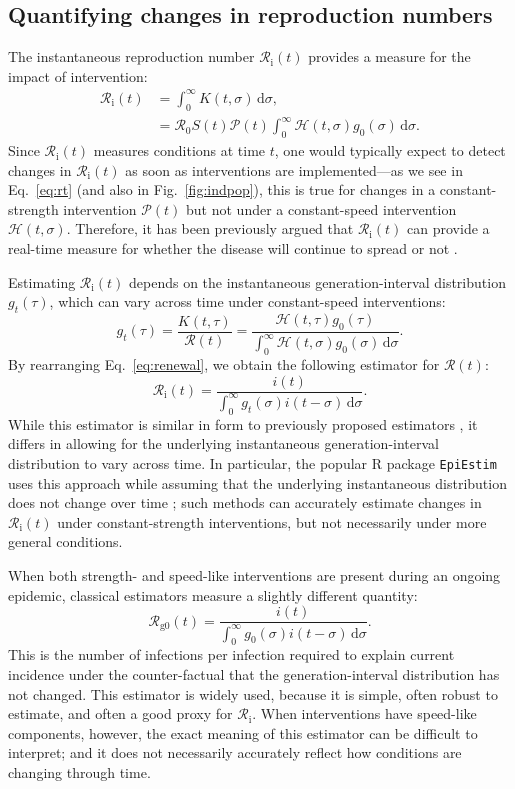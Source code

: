 \documentclass[12pt]{article}
\newcommand{\eref}[1]{Eq.~\ref{eq:#1}}
\newcommand{\fref}[1]{Fig.~\ref{fig:#1}}
\newcommand{\Rx}[1]{\ensuremath{{\mathcal R}_{#1}}\xspace}
\newcommand{\Ri}{\Rx{\mathrm{i}}}
\newcommand{\RR}{\ensuremath{{\mathcal R}}\xspace}
\newcommand{\Rcori}{\Rx{\mathrm{g0}}}
\newcommand{\dd}[1]{\ensuremath{\, \mathrm{d}#1}}
\newcommand{\dsigma}{\dd{\sigma}}
\newcommand{\PP}{\ensuremath{\mathcal P}}
\newcommand{\HH}{\ensuremath{\mathcal H}}
\begin{document}
\subsection{Quantifying changes in reproduction numbers}

The instantaneous reproduction number $\Ri(t)$ provides a measure for the impact of intervention:
\begin{align}
\Ri(t) &= \int_0^\infty K(t, \sigma) \dsigma, \\
&= \RR_0 S(t) \PP(t) \int_0^\infty \HH(t,\sigma) g_0(\sigma) \dsigma.
\label{eq:rt}
\end{align}
Since $\Ri(t)$ measures conditions at time $t$, one would typically expect to detect changes in $\Ri(t)$ as soon as interventions are implemented---as we see in \eref{rt} (and also in \fref{indpop}), this is true for changes in a constant-strength intervention $\PP(t)$ but not under a constant-speed intervention $\HH(t, \sigma)$.
Therefore, it has been previously argued that $\Ri(t)$ can provide a real-time measure for whether the disease will continue to spread or not \citep{gostic2020practical}.

Estimating $\Ri(t)$ depends on the instantaneous generation-interval distribution $g_t(\tau)$,
which can vary across time under constant-speed interventions:
\begin{equation}
g_t(\tau) = \frac{K(t, \tau)}{\RR(t)} = \frac{\HH(t,\tau) g_0(\tau)}{\int_0^\infty \HH(t,\sigma) g_0(\sigma) \dsigma}.
\end{equation}
By rearranging \eref{renewal}, we obtain the following estimator for $\RR(t)$:
\begin{equation}
\Ri(t) = \frac{i(t)}{\int_0^\infty g_t(\sigma) i(t-\sigma) \dsigma}.
\end{equation}
While this estimator is similar in form to previously proposed estimators \citep{fraser2007estimating}, it differs in allowing for the underlying instantaneous generation-interval distribution to vary across time.
In particular, the popular R package \texttt{EpiEstim} uses this approach while assuming that the underlying instantaneous distribution does not change over time \citep{cori2013new};  
such methods can accurately estimate changes in $\Ri(t)$ under constant-strength interventions, but not necessarily under more general conditions.

When both strength- and speed-like interventions are present during an ongoing epidemic, classical estimators \citep{fraser2007estimating,cori2013new} measure a slightly different quantity:
\begin{equation}
\Rcori(t) = \frac{i(t)}{\int_0^\infty g_0(\sigma) i(t-\sigma) \dsigma}.
\end{equation}
This is the number of infections per infection required to explain current incidence under the counter-factual that the generation-interval distribution has not changed.
This estimator is widely used, because it is simple, often robust to estimate, and often a good proxy for \Ri.
When interventions have speed-like components, however, the exact meaning of this estimator can be difficult to interpret; 
and it does not necessarily accurately reflect how conditions are changing through time.
\end{document}
